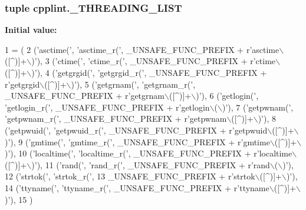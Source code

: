\subsubsection[{\texorpdfstring{\+\_\+\+T\+H\+R\+E\+A\+D\+I\+N\+G\+\_\+\+L\+I\+ST}{_THREADING_LIST}}]{\setlength{\rightskip}{0pt plus 5cm}tuple cpplint.\+\_\+\+T\+H\+R\+E\+A\+D\+I\+N\+G\+\_\+\+L\+I\+ST\hspace{0.3cm}{\ttfamily [private]}}\hypertarget{namespacecpplint_a35b2c753549d4a10e56d6ff4ff49d52a}{}\label{namespacecpplint_a35b2c753549d4a10e56d6ff4ff49d52a}
{\bfseries Initial value\+:}
\begin{DoxyCode}
1 = (
2     (\textcolor{stringliteral}{'asctime('}, \textcolor{stringliteral}{'asctime\_r('}, \_UNSAFE\_FUNC\_PREFIX + \textcolor{stringliteral}{r'asctime\(\backslash\)([^)]+\(\backslash\))'}),
3     (\textcolor{stringliteral}{'ctime('}, \textcolor{stringliteral}{'ctime\_r('}, \_UNSAFE\_FUNC\_PREFIX + \textcolor{stringliteral}{r'ctime\(\backslash\)([^)]+\(\backslash\))'}),
4     (\textcolor{stringliteral}{'getgrgid('}, \textcolor{stringliteral}{'getgrgid\_r('}, \_UNSAFE\_FUNC\_PREFIX + \textcolor{stringliteral}{r'getgrgid\(\backslash\)([^)]+\(\backslash\))'}),
5     (\textcolor{stringliteral}{'getgrnam('}, \textcolor{stringliteral}{'getgrnam\_r('}, \_UNSAFE\_FUNC\_PREFIX + \textcolor{stringliteral}{r'getgrnam\(\backslash\)([^)]+\(\backslash\))'}),
6     (\textcolor{stringliteral}{'getlogin('}, \textcolor{stringliteral}{'getlogin\_r('}, \_UNSAFE\_FUNC\_PREFIX + \textcolor{stringliteral}{r'getlogin\(\backslash\)(\(\backslash\))'}),
7     (\textcolor{stringliteral}{'getpwnam('}, \textcolor{stringliteral}{'getpwnam\_r('}, \_UNSAFE\_FUNC\_PREFIX + \textcolor{stringliteral}{r'getpwnam\(\backslash\)([^)]+\(\backslash\))'}),
8     (\textcolor{stringliteral}{'getpwuid('}, \textcolor{stringliteral}{'getpwuid\_r('}, \_UNSAFE\_FUNC\_PREFIX + \textcolor{stringliteral}{r'getpwuid\(\backslash\)([^)]+\(\backslash\))'}),
9     (\textcolor{stringliteral}{'gmtime('}, \textcolor{stringliteral}{'gmtime\_r('}, \_UNSAFE\_FUNC\_PREFIX + \textcolor{stringliteral}{r'gmtime\(\backslash\)([^)]+\(\backslash\))'}),
10     (\textcolor{stringliteral}{'localtime('}, \textcolor{stringliteral}{'localtime\_r('}, \_UNSAFE\_FUNC\_PREFIX + \textcolor{stringliteral}{r'localtime\(\backslash\)([^)]+\(\backslash\))'}),
11     (\textcolor{stringliteral}{'rand('}, \textcolor{stringliteral}{'rand\_r('}, \_UNSAFE\_FUNC\_PREFIX + \textcolor{stringliteral}{r'rand\(\backslash\)(\(\backslash\))'}),
12     (\textcolor{stringliteral}{'strtok('}, \textcolor{stringliteral}{'strtok\_r('},
13      \_UNSAFE\_FUNC\_PREFIX + \textcolor{stringliteral}{r'strtok\(\backslash\)([^)]+\(\backslash\))'}),
14     (\textcolor{stringliteral}{'ttyname('}, \textcolor{stringliteral}{'ttyname\_r('}, \_UNSAFE\_FUNC\_PREFIX + \textcolor{stringliteral}{r'ttyname\(\backslash\)([^)]+\(\backslash\))'}),
15     )
\end{DoxyCode}
